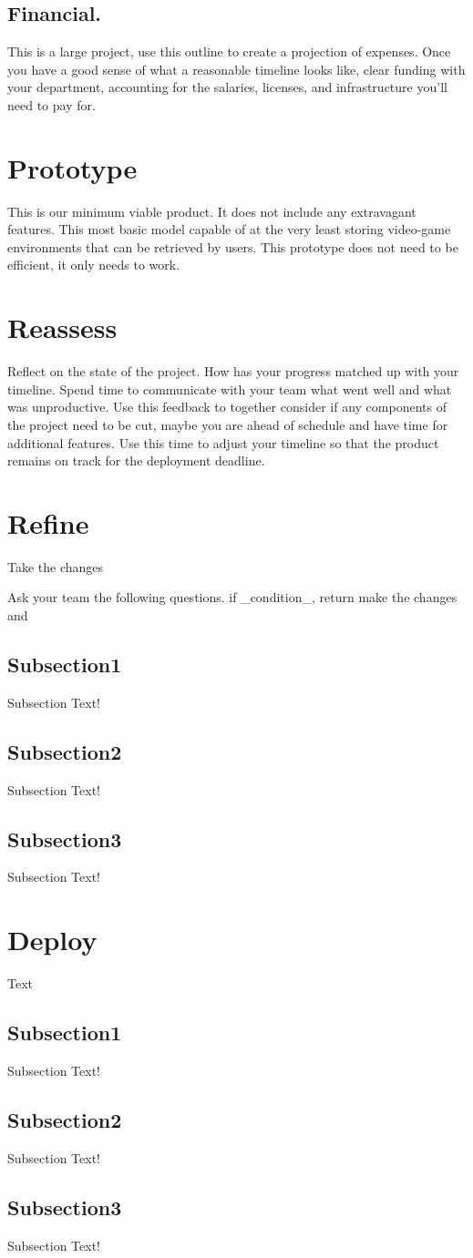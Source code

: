 \documentclass[12pt,journal,compsoc]{IEEEtran}
\begin{document}
    \subsection{Financial. }\hphantom{m}This is a large project, use this outline to create a projection of expenses. Once you have a good sense of what a reasonable timeline looks like, clear funding with your department, accounting for the salaries, licenses, and infrastructure you'll need to pay for.
    
\section{Prototype} This is our minimum viable product. It does not include any extravagant features. This most basic model capable of at the very least storing video-game environments that can be retrieved by users. This prototype does not need to be efficient, it only needs to work.

\section{Reassess} Reflect on the state of the project. How has your progress matched up with your timeline. Spend time to communicate with your team what went well and what was unproductive. Use this feedback to together consider if any components of the project need to be cut, maybe you are ahead of schedule and have time for additional features. Use this time to adjust your timeline so that the product remains on track for the deployment deadline.
\section{Refine} Take the changes 

Ask your team the following questions. if \_condition\_, return make the changes and
    \subsection{Subsection1}Subsection Text!
    \subsection{Subsection2}Subsection Text!
    \subsection{Subsection3}Subsection Text!
\section{Deploy} Text
    \subsection{Subsection1}Subsection Text!
    \subsection{Subsection2}Subsection Text!
    \subsection{Subsection3}Subsection Text!

		
\end{document}
